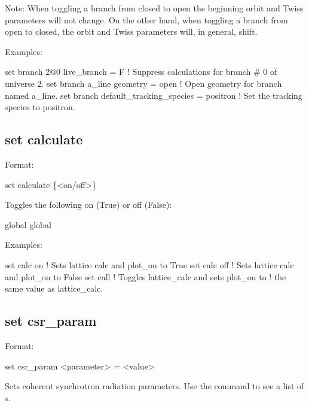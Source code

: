 {{Note: When toggling a branch from closed to open the beginning orbit and Twiss parameters will not
change. On the other hand, when toggling a branch from open to closed, the orbit and Twiss
parameters will, in general, shift.

Examples:
\begin{example}
  set branch 2@0 live_branch = F     ! Suppress calculations for branch \# 0 of universe 2.
  set branch a_line geometry = open  ! Open geometry for branch named a_line.
  set branch default_tracking_species = positron
                                     ! Set the tracking species to positron.
\end{example}


\subsection{set calculate}
\label{s:set.calc}

Format:
\begin{example}
  set calculate \{<on/off>\}
\end{example}

Toggles the following on (True) or off (False):
\begin{example}
  global%
  global%
\end{example}

Examples:
\begin{example}
  set calc on    ! Sets lattice calc and plot_on to True
  set calc off   ! Sets lattice calc and plot_on to False
  set call       ! Toggles lattice_calc and sets plot_on to
                 !  the same value as lattice_calc.
\end{example}


\subsection{set csr_param}
\label{s:set.csr.param}

Format:
\begin{example}
  set csr_param <parameter> = <value>
\end{example}

Sets coherent synchrotron radiation parameters. Use the 
command to see a list of s.

}}
